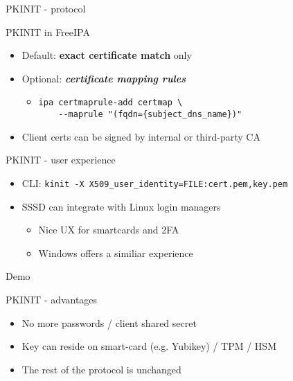 \documentclass[ignorenonframetext,aspectratio=169,12pt]{beamer}
\def\svgwidth{4cm}
\begin{document}
\begin{frame}{PKINIT - protocol}
\begin{center}
\def\svgwidth{\textwidth}

\end{center}
\end{frame}

\begin{frame}{PKINIT in FreeIPA}
\protect\hypertarget{pkinit-in-freeipa}{}
\begin{itemize}
    \item Default: {\bf exact certificate match} only
    \item Optional: \textbf{\em certificate mapping rules}
        \begin{itemize}
            \item {\tt ipa certmaprule-add certmap \textbackslash{} \\
                ~~~~{-}{-}maprule "(fqdn=\{subject\_dns\_name\})"}
        \end{itemize}
    \item Client certs can be signed by internal or third-party CA
\end{itemize}
\end{frame}

\begin{frame}{PKINIT - user experience}
\protect\hypertarget{pkinit-ux}{}
\begin{itemize}
    \item CLI: {\tt kinit -X X509\_user\_identity=FILE:cert.pem,key.pem}
    \item SSSD can integrate with Linux login managers
        \begin{itemize}
            \item Nice UX for smartcards and 2FA
            \item Windows offers a similiar experience
        \end{itemize}
\end{itemize}
\end{frame}

\begin{frame}[plain]
\centering
\huge Demo
\end{frame}


\begin{frame}{PKINIT - advantages}
\protect\hypertarget{pkinit-advantages}{}
\begin{itemize}
    \item No more passwords / client shared secret
    \item Key can reside on smart-card (e.g. Yubikey) / TPM / HSM
    \item The rest of the protocol is unchanged
\end{itemize}
\end{frame}
\end{document}
